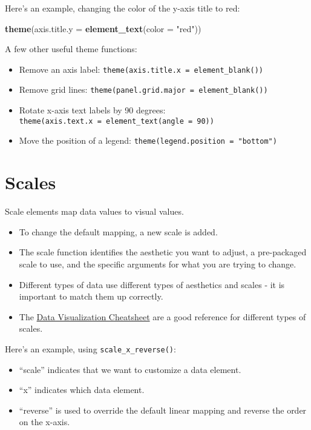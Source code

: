 \documentclass[]{book}
\newenvironment{Shaded}{\begin{snugshade}}{\end{snugshade}}
\newcommand{\KeywordTok}[1]{\textcolor[rgb]{0.13,0.29,0.53}{\textbf{{#1}}}}
\newcommand{\DataTypeTok}[1]{\textcolor[rgb]{0.13,0.29,0.53}{{#1}}}
\newcommand{\StringTok}[1]{\textcolor[rgb]{0.31,0.60,0.02}{{#1}}}
\newcommand{\NormalTok}[1]{{#1}}
\theoremstyle{definition}
\theoremstyle{definition}
\theoremstyle{remark}
\begin{document}
Here's an example, changing the color of the y-axis title to red:

\begin{Shaded}
\begin{Highlighting}[]
\KeywordTok{theme}\NormalTok{(}\DataTypeTok{axis.title.y =} \KeywordTok{element_text}\NormalTok{(}\DataTypeTok{color =} \StringTok{"red"}\NormalTok{))}
\end{Highlighting}
\end{Shaded}

A few other useful theme functions:

\begin{itemize}
\item
  Remove an axis label:
  \texttt{theme(axis.title.x\ =\ element\_blank())}
\item
  Remove grid lines:
  \texttt{theme(panel.grid.major\ =\ element\_blank())}
\item
  Rotate x-axis text labels by 90 degrees:
  \texttt{theme(axis.text.x\ =\ element\_text(angle\ =\ 90))}
\item
  Move the position of a legend:
  \texttt{theme(legend.position\ =\ "bottom")}
\end{itemize}

\section{Scales}\label{scales}

Scale elements map data values to visual values.

\begin{itemize}
\item
  To change the default mapping, a new scale is added.
\item
  The scale function identifies the aesthetic you want to adjust, a
  pre-packaged scale to use, and the specific arguments for what you are
  trying to change.
\item
  Different types of data use different types of aesthetics and scales -
  it is important to match them up correctly.
\item
  The \href{https://www.rstudio.com/resources/cheatsheets}{Data
  Visualization Cheatsheet} are a good reference for different types of
  scales.
\end{itemize}

Here's an example, using \texttt{scale\_x\_reverse()}:

\begin{itemize}
\item
  ``scale'' indicates that we want to customize a data element.
\item
  ``x'' indicates which data element.
\item
  ``reverse'' is used to override the default linear mapping and reverse
  the order on the x-axis.
\end{itemize}
\end{document}
